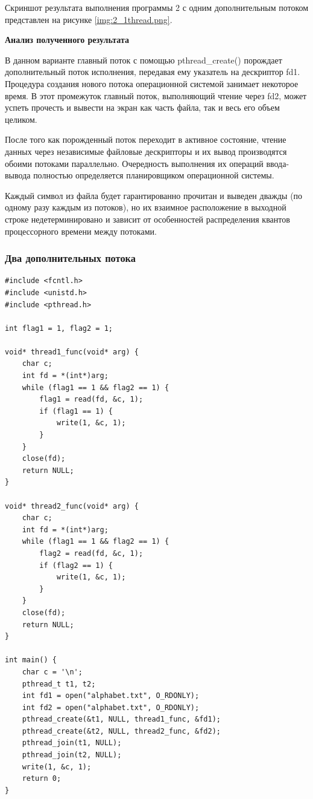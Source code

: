 Скриншот результата выполнения программы 2 с одним дополнительным потоком представлен на рисунке \ref{img:2_1thread.png}.

\textbf{Анализ полученного результата}

В данном варианте главный поток с помощью pthread\_create() порождает дополнительный поток исполнения, передавая ему указатель на дескриптор fd1. Процедура создания нового потока операционной системой занимает некоторое время. В этот промежуток главный поток, выполняющий чтение через fd2, может успеть прочесть и вывести на экран как часть файла, так и весь его объем целиком.

После того как порожденный поток переходит в активное состояние, чтение данных через независимые файловые дескрипторы и их вывод производятся обоими потоками параллельно. Очередность выполнения их операций ввода-вывода полностью определяется планировщиком операционной системы.

Каждый символ из файла будет гарантированно прочитан и выведен дважды (по одному разу каждым из потоков), но их взаимное расположение в выходной строке недетерминировано и зависит от особенностей распределения квантов процессорного времени между потоками.

\clearpage

\subsubsection{Два дополнительных потока}
\begin{lstlisting}[caption={Исходный код Программы 2 с двумя дополнительными потоками}]
#include <fcntl.h>
#include <unistd.h>
#include <pthread.h>

int flag1 = 1, flag2 = 1;

void* thread1_func(void* arg) {
    char c;
    int fd = *(int*)arg;
    while (flag1 == 1 && flag2 == 1) {
        flag1 = read(fd, &c, 1);
        if (flag1 == 1) {
            write(1, &c, 1);
        }
    }
    close(fd);
    return NULL;
}

void* thread2_func(void* arg) {
    char c;
    int fd = *(int*)arg;
    while (flag1 == 1 && flag2 == 1) {
        flag2 = read(fd, &c, 1);
        if (flag2 == 1) {
            write(1, &c, 1);
        }
    }
    close(fd);
    return NULL;
}

int main() {
    char c = '\n';
    pthread_t t1, t2;
    int fd1 = open("alphabet.txt", O_RDONLY);
    int fd2 = open("alphabet.txt", O_RDONLY);
    pthread_create(&t1, NULL, thread1_func, &fd1);
    pthread_create(&t2, NULL, thread2_func, &fd2);
    pthread_join(t1, NULL);
    pthread_join(t2, NULL);
    write(1, &c, 1);
    return 0;
}
\end{lstlisting}

